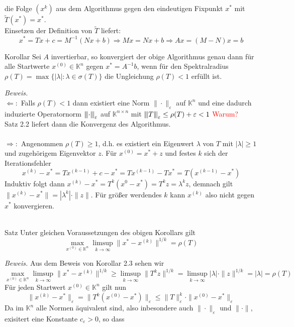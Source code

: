 \documentclass{article}
\begin{document}
die Folge $(x^k)$ aus dem Algorithmus gegen den eindeutigen Fixpunkt $x^*$ mit $\tilde{T}(x^*)=x^*$. \\ 
Einsetzen der Definition von $\tilde{T}$ liefert:
\[x^*=Tx+c=M^{-1}(Nx+b)\Rightarrow Mx=Nx+b \Rightarrow Ax=(M-N)x=b\]
\begin{thmbox}{Korollar}
    Sei $A$ invertierbar, so konvergiert der obige Algorithmus genau dann für alle Startwerte $x^{(0)}\in\mathbb{K}^n$ 
    gegen $x^*=A^{-1}b$, wenn für den Spektralradius $\rho(T)=\max\{|\lambda|:\lambda\in\sigma(T)\}$ 
    die Ungleichung $\rho(T)<1$ erfüllt ist.
\end{thmbox}
\textit{Beweis.} \\
$\Leftarrow:$ Falls $\rho(T)<1$ dann existiert eine Norm $\|\cdot\|_\varepsilon$ auf $\mathbb{K}^n$ 
und eine dadurch induzierte Operatornorm ${\left\vert\kern-0.25ex\left\vert\kern-0.25ex\left\vert \cdot \right\vert\kern-0.25ex\right\vert\kern-0.25ex\right\vert}_\varepsilon$ auf $\mathbb{K}^{n\times n}$ 
mit ${\left\vert\kern-0.25ex\left\vert\kern-0.25ex\left\vert T \right\vert\kern-0.25ex\right\vert\kern-0.25ex\right\vert}_\varepsilon \leq \rho(T) + \varepsilon < 1$ \textcolor{red}{Warum?} \\
Satz 2.2 liefert dann die Konvergenz des Algorithmus. \\ \\
$\Rightarrow:$ Angenommen $\rho(T)\geq 1$, d.h. es existiert ein Eigenwert $\lambda$ von $T$ 
mit $|\lambda|\geq 1$ und zugehörigem Eigenvektor $z$. Für $x^{(0)}=x^*+z$ und festes $k$ sich der Iterationsfehler
\[x^{(k)}-x^* = Tx^{(k-1)}+c-x^* = Tx^{(k-1)}-Tx^* = T(x^{(k-1)}-x^*)\]
Induktiv folgt dann $x^{(k)}-x^* = T^k(x^{0}-x^*)=T^kz=\lambda^kz$, demnach gilt 
$\|x^{(k)}-x^*\|=|\lambda^k|\cdot\|z\|$.
Für größer werdendes $k$ kann $x^{(k)}$ also nicht gegen $x^*$ konvergieren. \\ \\
\begin{thmbox}{Satz}
    Unter gleichen Voraussetzungen des obigen Korollars gilt 
    \[\max_{x^{(0)}\in\mathbb{K}^n} \limsup_{k\rightarrow \infty} \|x^*-x^{(k)}\|^{1/k}=\rho(T)\]
\end{thmbox}
\textit{Beweis.}
Aus dem Beweis von Korollar 2.3 sehen wir
\[\max_{x^{(0)}\in\mathbb{K}^n} \limsup_{k\rightarrow \infty} \|x^*-x^{(k)}\|^{1/k}
\geq\limsup_{k\rightarrow\infty} \|T^kz\|^{1/k}=\limsup_{k\rightarrow\infty}|\lambda|\cdot\|z\|^{1/k}
=|\lambda|=\rho(T)\]
Für jeden Startwert $x^{(0)}\in\mathbb{K}^n$ gilt nun 
\[\|x^{(k)}-x^*\|_\varepsilon = \|T^k(x^{(0)}-x^*)\|_\varepsilon
\leq \|T\|_\varepsilon^k\cdot \|x^{(0)}-x^*\|_\varepsilon\]
Da im $\mathbb{K}^n$ alle Normen äquivalent sind, also inbesondere auch $\|\cdot\|_\varepsilon$ 
und $\|\cdot\|$, exisitert eine Konstante $c_\varepsilon>0$, so dass
\end{document}
